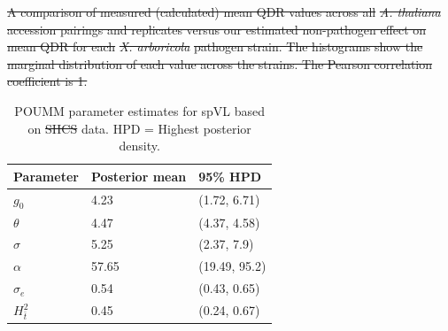 \documentclass[12pt]{article} %
\providecommand{\DIFadd}[1]{{\protect\color{blue}\uwave{#1}}} %
\providecommand{\DIFdel}[1]{{\protect\color{red}\sout{#1}}}                      %
\providecommand{\DIFdelbegin}{} %
\providecommand{\DIFdelend}{} %
\providecommand{\DIFaddFL}[1]{\DIFadd{#1}} %
\providecommand{\DIFdelFL}[1]{\DIFdel{#1}} %
\providecommand{\DIFaddbeginFL}{} %
\providecommand{\DIFaddendFL}{} %
\providecommand{\DIFdelbeginFL}{} %
\providecommand{\DIFdelendFL}{} %
\newcommand{\DIFscaledelfig}{0.5}
\newlength{\DIFdelgraphicswidth} %
\newlength{\DIFdelgraphicsheight} %
\newcommand{\DIFaddincludegraphics}[2][]{{\color{blue}\fbox{\DIFOincludegraphics[#1]{#2}}}} %
\newcommand{\DIFdelincludegraphics}[2][]{%
\sbox{\DIFdelgraphicsbox}{\DIFOincludegraphics[#1]{#2}}%
\settoboxwidth{\DIFdelgraphicswidth}{\DIFdelgraphicsbox} %
\settoboxtotalheight{\DIFdelgraphicsheight}{\DIFdelgraphicsbox} %
\scalebox{\DIFscaledelfig}{%
\parbox[b]{\DIFdelgraphicswidth}{\usebox{\DIFdelgraphicsbox}\\[-\baselineskip] \rule{\DIFdelgraphicswidth}{0em}}\llap{\resizebox{\DIFdelgraphicswidth}{\DIFdelgraphicsheight}{%
\setlength{\unitlength}{\DIFdelgraphicswidth}%
\begin{picture}(1,1)%
\thicklines\linethickness{2pt} %
{\color[rgb]{1,0,0}\put(0,0){\framebox(1,1){}}}%
{\color[rgb]{1,0,0}\put(0,0){\line( 1,1){1}}}%
{\color[rgb]{1,0,0}\put(0,1){\line(1,-1){1}}}%
\end{picture}%
}\hspace*{3pt}}} %
} %
\DeclareRobustCommand{\DIFdelbegin}{\DIFOdelbegin \let\includegraphics\DIFdelincludegraphics} %
\DeclareRobustCommand{\DIFdelend}{\DIFOaddend \let\includegraphics\DIFOincludegraphics} %
\DeclareRobustCommand{\DIFaddbeginFL}{\DIFOaddbeginFL \let\includegraphics\DIFaddincludegraphics} %
\DeclareRobustCommand{\DIFaddendFL}{\DIFOaddendFL \let\includegraphics\DIFOincludegraphics} %
\DeclareRobustCommand{\DIFdelbeginFL}{\DIFOdelbeginFL \let\includegraphics\DIFdelincludegraphics} %
\DeclareRobustCommand{\DIFdelendFL}{\DIFOaddendFL \let\includegraphics\DIFOincludegraphics} %
\begin{document}
\begin{doublespace}
\DIFdelbegin %
{%
\DIFdelFL{A comparison of measured (calculated) mean QDR values across all }\emph{\DIFdelFL{A. thaliana}} %
\DIFdelFL{accession pairings and replicates  versus our estimated non-pathogen effect on mean QDR for each }\emph{\DIFdelFL{X. arboricola}} %
\DIFdelFL{pathogen strain. The histograms show the marginal distribution of each value across the strains. The Pearson correlation coefficient is 1.}}

\DIFdelend \end{doublespace}  %

\newpage

\begin{table}[H]
\caption{POUMM parameter estimates for spVL based on \DIFdelbeginFL \DIFdelFL{SHCS }\DIFdelendFL \DIFaddbeginFL \DIFaddFL{Swiss }\DIFaddendFL data. HPD = Highest posterior density.}
	\begin{tabularx}{\linewidth}{XXX} \hline 
	Parameter & Posterior mean & 95\% HPD \\ \hline 
	${g_{0}}$ & 4.23 & (1.72, 6.71) \\
	$\theta$ & 4.47 & (4.37, 4.58) \\
	$\sigma$ & 5.25 & (2.37, 7.9) \\
	$\alpha$ & 57.65 & (19.49, 95.2) \\
	$\sigma_e$ & 0.54 & (0.43, 0.65) \\ 
	$H^2_{\bar{t}}$ & 0.45 & (0.24, 0.67) \\ \hline
	\end{tabularx}
	\label{tab:POUMM-parameters-our-estimates}
\end{table}
\end{document}
